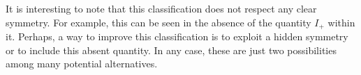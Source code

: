 \documentclass[12pt]{article}
\theoremstyle{definition}
\begin{document}
It is interesting to note that this classification does not respect any clear symmetry. For example, this can be seen in the absence of the quantity $I_+$ within it. Perhaps, a way to improve this classification is to exploit a hidden symmetry or to include this absent quantity. In any case, these are just two possibilities among many potential alternatives.

\end{document}
